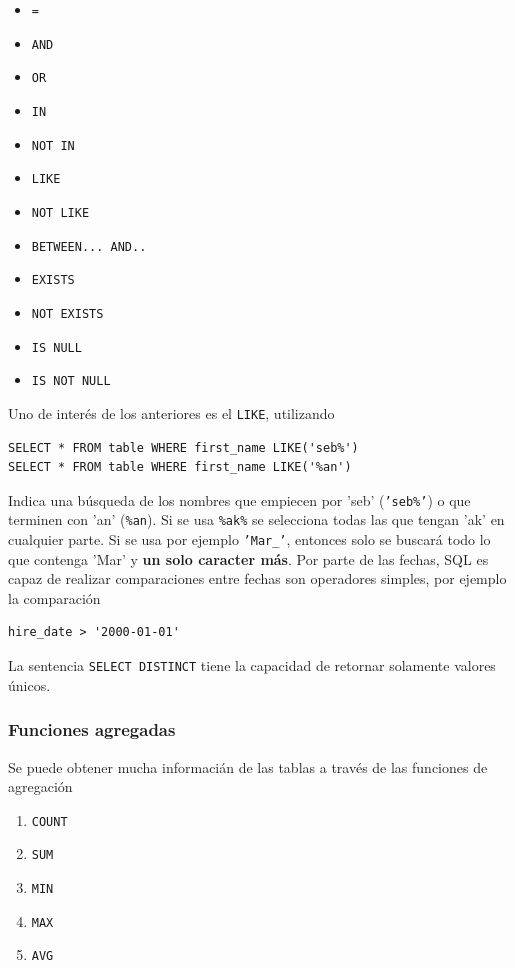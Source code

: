 \begin{itemize}
     \item \texttt{=}
     \item \texttt{AND}
     \item \texttt{OR}
     \item \texttt{IN}
     \item \texttt{NOT IN}
     \item \texttt{LIKE}
     \item \texttt{NOT LIKE}
     \item \texttt{BETWEEN... AND..}
     \item \texttt{EXISTS}
     \item \texttt{NOT EXISTS}
     \item \texttt{IS NULL}
     \item \texttt{IS NOT NULL}

 \end{itemize}

 Uno de interés de los anteriores es el \texttt{LIKE}, utilizando
 \begin{verbatim}
SELECT * FROM table WHERE first_name LIKE('seb%')
SELECT * FROM table WHERE first_name LIKE('%an')
 \end{verbatim}
Indica una búsqueda de los nombres que empiecen por 'seb' (\texttt{'seb\%'}) o que terminen con 'an' (\texttt{\%an}). Si se usa \texttt{\%ak\%} se selecciona todas las que tengan 'ak' en cualquier parte. Si se usa por ejemplo \texttt{'Mar\_'}, entonces solo se buscará todo lo que contenga 'Mar' y \textbf{un solo caracter más}. Por parte de las fechas, SQL es capaz de realizar comparaciones entre fechas son operadores simples, por ejemplo la comparación
\begin{verbatim} 
hire_date > '2000-01-01'
\end{verbatim}
La sentencia \texttt{SELECT DISTINCT} tiene la capacidad de retornar solamente valores únicos.

\subsubsection{Funciones agregadas}

Se puede obtener mucha informacián de las tablas a través de las funciones de agregación 

\begin{enumerate}
    \item \texttt{COUNT}
    \item \texttt{SUM}
    \item \texttt{MIN}
    \item \texttt{MAX}
    \item \texttt{AVG}
\end{enumerate}

